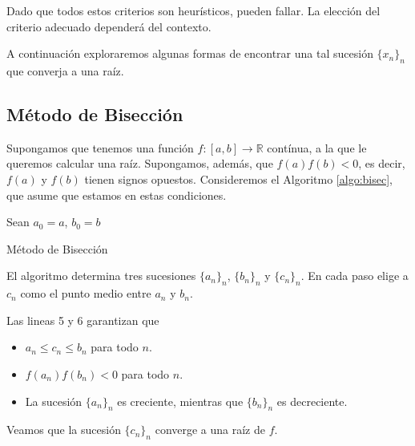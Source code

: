 Dado que todos estos criterios son heurísticos, pueden fallar. La elección del criterio adecuado dependerá del contexto.

A continuación exploraremos algunas formas de encontrar una tal sucesión $\{x_n\}_n$ que converja a una raíz.

\subsection{Método de Bisección}

Supongamos que tenemos una función $f:[a, b] \to \mathbb{R}$ contínua, a la que le queremos calcular una raíz. Supongamos, además, que $f(a)f(b) < 0$, es decir, $f(a)$ y $f(b)$ tienen signos opuestos. Consideremos el Algoritmo \ref{algo:bisec}, que asume que estamos en estas condiciones.

\begin{algorithm}
\label{algo:bisec}
\dontprintsemicolon



Sean $a_0 = a$, $b_0 = b$\;

\caption[]{Método de Bisección}
\end{algorithm}

El algoritmo determina tres sucesiones $\{a_n\}_n$, $\{b_n\}_n$ y $\{c_n\}_n$. En cada paso elige a $c_n$ como el punto medio entre $a_n$ y $b_n$. 

\begin{obs}
Las lineas 5 y 6 garantizan que

\begin{itemize}
\item $a_n \leq c_n \leq b_n$ para todo $n$.

\item $f(a_n)f(b_n) < 0$ para todo $n$.

\item La sucesión $\{a_n\}_n$ es creciente, mientras que $\{b_n\}_n$ es decreciente.
\end{itemize}
\end{obs}

Veamos que la sucesión $\{c_n\}_n$ converge a una raíz de $f$.

